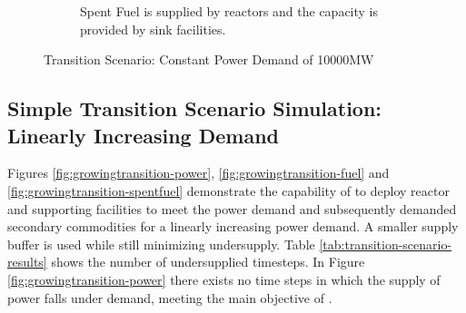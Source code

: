 \begin{figure}[]
\begin{subfigure}[t]{0.6\textwidth}
            \caption{Spent Fuel is supplied by reactors and the capacity is provided by sink facilities.}
            \label{fig:constanttransition-spentfuel}
        \end{subfigure}
        \caption{Transition Scenario: Constant Power Demand of 10000MW}
    \end{figure}

    \subsection{Simple Transition Scenario Simulation: Linearly Increasing Demand}

    Figures \ref{fig:growingtransition-power}, \ref{fig:growingtransition-fuel}
    and \ref{fig:growingtransition-spentfuel} demonstrate the capability 
    of \deploy to deploy reactor and supporting facilities to meet the
    power demand and subsequently demanded secondary commodities 
    for a linearly increasing power demand. 
    A smaller supply buffer is used while still minimizing undersupply.
    Table \ref{tab:transition-scenario-results} shows the number of 
    undersupplied timesteps. 
    In Figure \ref{fig:growingtransition-power} there exists no time steps 
    in which the supply of power falls under demand, meeting the main 
    objective of \deploy. 
    

